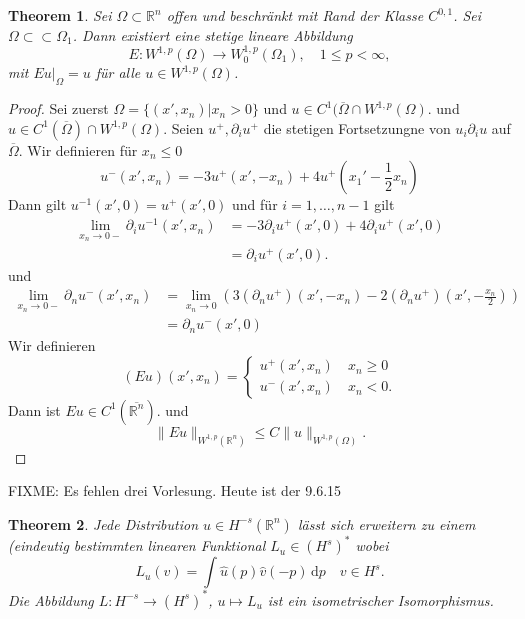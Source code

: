 \documentclass[
paper=a4,
bibtotocnumbered,
liststotocnumbered,
tablecaptionabove,
pointlessnumbers,
twoside,
openright,
10pt
]
{report}
\newtheorem{thm}{Theorem}[chapter]
\theoremstyle{definition}
\numberwithin{equation}{chapter}
\begin{document}
\begin{thm}\label{4.6}
 Sei $\Omega\subset \mathbb R^n$ offen und beschränkt mit Rand der Klasse $C^{0,1}$. Sei $\Omega \subset \subset \Omega_1$. Dann existiert eine stetige lineare Abbildung
 \begin{equation}
 E: W^{1,p}(\Omega) \to W_{0}^{1,p}(\Omega_1), \quad 1\le p <\infty,
 \end{equation}
 mit $Eu\big|_\Omega=u$ für alle $u\in W^{1,p}(\Omega)$.
\end{thm}
\begin{proof}
 Sei zuerst $\Omega=\{(x', x_n) |x_n >0\}$ und $u\in C^1(\overline{\Omega} \cap W^{1,p}(\Omega)$. und $u\in C^1(\overline{\Omega}) \cap W^{1,p}(\Omega)$. Seien $u^+, \partial_i u^+$ die stetigen Fortsetzungne von $u_i \partial_i u$ auf $\overline{\Omega}$. Wir definieren für $x_n \le 0$
 \begin{equation}
  u^{-}(x', x_n) = - 3 u^+(x', -x_n) + 4u^+\left (x_1' - \frac{1}{2} x_n\right )
 \end{equation}
 Dann gilt $u^{-1}(x',0)=u^+(x',0)$ und für
 $i=1, \ldots, n-1$ gilt
 \begin{align*}
  \lim_{x_n\to 0-} \partial_i  u^{-1}(x', x_n) &= - 3\partial_i u^{+}(x',0) + 4\partial_i u^+(x',0) \\
  &=\partial_i u^+ (x',0).
 \end{align*}
und 
\begin{align*}
 \lim_{x_n\to 0-} \partial_n u^{-} (x', x_n) &= \lim_{x_n\to 0} (3(\partial_n u^+) (x', -x_n) - 2(\partial_n u^+) (x', -\frac{x_n}{2}))\\
 &=\partial_n u^{-}(x',0)
\end{align*}
Wir definieren
\begin{equation}
 (Eu)(x', x_n) = \begin{cases}
                  u^{+}(x', x_n) \quad x_n \ge 0 \\
                  u^{-}(x', x_n) \quad x_n <0.
                 \end{cases}
\end{equation}
Dann ist $Eu\in C^1(\overline{\mathbb R^n})$. und 
\begin{equation}
 \| Eu\|_{W^{1,p}(\mathbb R^n)} \le C\|u\|_{W^{1,p}(\Omega)}.
\end{equation}
\end{proof}
FIXME: Es fehlen drei Vorlesung. Heute ist der 9.6.15
\begin{thm}\label{4.6}
Jede Distribution $u\in H^{-s}(\mathbb R^n)$ lässt sich erweitern zu einem (eindeutig bestimmten linearen Funktional $L_u \in (H^s)^*$ wobei 
\begin{equation}
L_u(v) = \int \hat u(p) \hat v(-p)\, \mathrm dp \quad v\in H^s.
\end{equation}
Die Abbildung $L: H^{-s}\to (H^s)^*$, $u\mapsto L_u$ ist ein isometrischer Isomorphismus. 
\end{thm}
\end{document}
